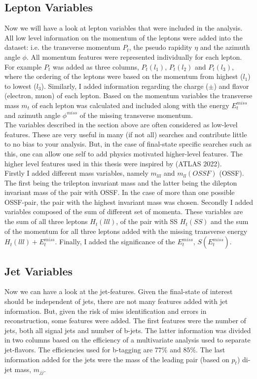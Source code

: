 \subsection{Lepton Variables}\label{subsec:LepSel}
Now we will have a look at lepton variables that were included in the analysis. All low level information on the
momentum of the leptons were added into the dataset: i.e. the transverse momentum $P_t$, the pseudo rapidity $\eta$ and the azimuth
angle $\phi$. All momentum features were represented individually for each lepton. For example $P_t$ was added as three columns, $P_t(l_1)$,
$P_t(l_2)$ and $P_t(l_3)$, where the ordering of the leptons were based on the momentum from highest ($l_1$) to lowest ($l_3$).
Similarly, I added information regarding the charge ($\pm$) and flavor (electron, muon) of each lepton. Based on the momentum variables
the transverse mass $m_t$ of each lepton was calculated and included along with the energy $E_t^{miss}$ and azimuth angle $\phi^{miss}$ 
of the missing transverse momentum.
\\
The variables described in the section above are often considered as low-level features. These are very useful in many (if not all)
searches and contribute little to no bias to your analysis. But, in the case of final-state specific searches such as this,
one can allow one self to add physics motivated higher-level features. The higher level features used in this thesis
were inspired by \cite{franchini_search_2019} (ATLAS 2022). 
\\
Firstly I added different mass variables, namely $m_{lll}$ and $m_{ll}(OSSF)$ (\ac{OSSF}). The first being the trilepton invariant mass 
and the latter being the dilepton invariant mass of the pair with \ac{OSSF}. In the case of more than one possible OSSF-pair,
the pair with the highest invariant mass was chosen. Secondly I added variables composed of the sum of different set of momenta.
These variables are the sum of all three leptons $H_t(lll)$, of the pair with \ac{SS} $H_t(SS)$ and the sum of the momentum
for all three leptons added with the missing transverse energy $H_t(lll) + E_t^{miss}$. Finally, I added the significance of the
$E_t^{miss}$, $S(E_t^{miss})$.
\subsection{Jet Variables}\label{subsec:JetSel}
Now we can have a look at the jet-features. Given the final-state of interest should be independent of jets, there are not many
features added with jet information. But, given the risk of miss identification and errors in reconstruction, some features were 
added. The first features were the number of jets, both all signal jets and number of b-jets.
The latter information was divided in two columns based on the efficiency of a multivariate analysis used to separate jet-flavors.
The efficiencies used for b-tagging are $77\%$ and $85\%$. The last information added for the jets were the mass of the leading pair 
(based on $p_t$) di-jet mass, $m_{jj}$.

